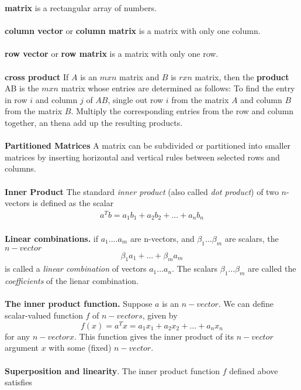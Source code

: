 \documentclass[a4paper, 12pt]{article}
\begin{document}
\textbf{matrix} is a rectangular array of numbers.\\
\\
\textbf{column vector} or \textbf{column matrix} is a matrix with only one column.\\
\\
\textbf{row vector} or \textbf{row matrix} is a matrix with only one row.\\
\\
\textbf{cross product} If $A$ is an $m x n$ matrix and $B$ is $r x n$ matrix, 
then the \textbf{product} AB is the $m x n$ matrix whose entries are determined 
as follows: To find the entry in row $i$ and column $j$ of $AB$, single out row $i$ 
from the matrix $A$ and column $B$ from the matrix $B$. Multiply the corresponding
entries from the row and column together, an thena add up the resulting
products.\\
\\ 
\textbf{Partitioned Matrices} A matrix can be subdivided or partitioned into smaller
matrices by inserting horizontal and vertical rules between selected rows and columns.\\
\\
\textbf{Inner Product}
The standard \textit{inner product} (also called \textit{dot product}) of 
two $n$-vectors is defined as the scalar
\begin{align*}
a^Tb = a_1b_1 + a_2b_2 + ... + a_nb_n
\end{align*}
\\
\textbf{Linear combinations.}
if $a_1....a_m$ are n-vectors, and $\beta_1...\beta_m$ are scalars, the $n-vector$
\begin{align*}
\beta_1a_1+...+\beta_ma_m
\end{align*}
is called a \textit{linear combination} of vectors $a_1...a_n$. The scalars $\beta_1...\beta_m$
 are called the \textit{coefficients} of the lienar combination.
\\
\\
\textbf{The inner product function.} Suppose $a$ is an $n-vector$. We can define scalar-valued
function $f$ of $n-vectors$, given by
\begin{equation}
f(x) = a^Tx = a_1x_1 + a_2x_2+...+a_nx_n
\end{equation}
for any $n-vector x$. This function gives the inner product of its $n-vector$ argument $x$ with
some (fixed) $n-vector$.
\\
\\
\textbf{Superposition and linearity}. The inner product function $f$ defined above satisfies
\end{document}
